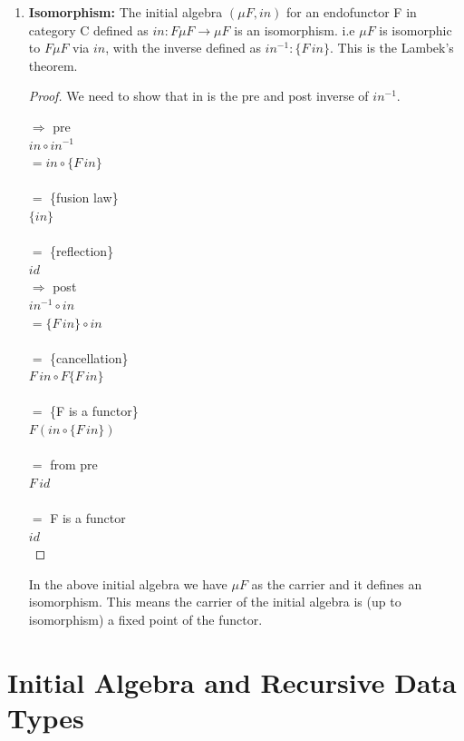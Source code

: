 \documentclass{article}
\begin{document}
\begin{enumerate}
\item{\textbf{Isomorphism:} The initial algebra $(\mu F, in)$ for an endofunctor F in category C defined as $in : F \mu F \rightarrow \mu F$ is an isomorphism. i.e $\mu F$ is isomorphic to $F \mu F$ via $in$, with the inverse defined as $in ^{-1} : \{F\, in\}$. This is the Lambek's theorem.

\begin{proof}
We need to show that in is the pre and post inverse of $in ^{-1}$.

$\Longrightarrow$ pre \\
$in \circ in ^{-1}$  \\
$=  in \circ \{F\, in\}$  \\ \\
$=$  \{fusion law\}  \\
$   \{in\}$  \\ \\
$=$  \{reflection\}  \\
$   id$ \\

$\Longrightarrow$ post \\
$in ^{-1} \circ in$ \\
$=  \{F\, in\} \circ in$ \\ \\
$=$  \{cancellation\} \\
$   F\, in \circ F \{F\, in\}$ \\ \\
$=$  \{F is a functor\} \\
$   F (in \circ \{F\, in\})$ \\ \\
$=$  {from pre} \\
$   F\, id$ \\ \\
$=$  {F is a functor} \\
$   id$ \\
\end{proof}
In the above initial algebra we have $\mu F$ as the carrier and it defines an isomorphism. This means the carrier of the initial algebra is (up to isomorphism) a fixed point of the functor.
}

\end{enumerate}

\section{Initial Algebra and Recursive Data Types}
\end{document}
